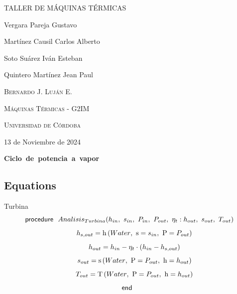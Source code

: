 \documentclass[10pt,fleqn]{article}
\author{Gustavo Vergara}
\theoremstyle{mytheoremstyle}
\theoremstyle{mytheoremstyle}
\theoremstyle{myproblemstyle}
\newcommand{\F}[1]{\mbox{$#1$}}
\newcommand{\K}[1]{\mbox{\sf#1\ \ \mit}}
\newcommand{\I}{\mbox{\hspace{0.20in}}}
\newcommand{\temperature}{\mathrm{T}}
\newcommand{\enthalpy}{\mathrm{h}}
\newcommand{\entropy}{\mathrm{s}}
\begin{document}
\begin{titlepage}
	\centering
	\vspace{2.5cm}
	{\scshape \Large TALLER DE MÁQUINAS TÉRMICAS\par}
	\vspace{5cm}
	\textbf\large\scshape{\par}
	\vspace{0.5cm}
	{\Large Vergara Pareja Gustavo\par}
    {\Large Martínez Causil Carlos Alberto\par}
    {\Large Soto Suárez Iván Esteban\par}
    {\Large Quintero Martínez Jean Paul\par}
	\vspace{5cm}
	{\scshape\Large Bernardo J. Luján E. \par}
	\vspace{0.3cm}
	{\scshape\Large Máquinas Térmicas - G2IM \par}
	\vspace{0.3cm}
	{\scshape\Large Universidad de Córdoba\par}
	\vspace{0.3cm}
	{\Large 13 de Noviembre de 2024 \par}
\end{titlepage}
\begin{center}
\bf \mbox{Ciclo de potencia a vapor}
\vspace{0.2 in}
\end{center}
\subsection*{Equations}

\vspace{0.10in}
\noindent
{\color{blue} \rm Turbina}
\begin{equation}
\label{EES Eqn:1}
\K{procedure} \F{Analisis_{Turbina}}{ \left( h_{in},\ s_{in},\ P_{in},\ P_{out},\ \eta_{t}:h_{out},\ s_{out},\ T_{out} \right) } 
\end{equation}
\begin{equation}
\I \label{EES Eqn:2}
h_{s,out} = \enthalpy \left(\F{Water},\mbox{\ s}=s_{in},\mbox{\ P}=P_{out} \right)  
\end{equation}
\begin{equation}
\I \label{EES Eqn:3}
h_{out} = h_{in}-\eta_{t}\cdot  \left( h_{in}-h_{s,out} \right)  
\end{equation}
\begin{equation}
\I \label{EES Eqn:4}
s_{out} = \entropy \left(\F{Water},\mbox{\ P}=P_{out},\mbox{\ h}=h_{out} \right)  
\end{equation}
\begin{equation}
\I \label{EES Eqn:5}
T_{out} = \temperature \left(\F{Water},\mbox{\ P}=P_{out},\mbox{\ h}=h_{out} \right)  
\end{equation}
\begin{equation}
\label{EES Eqn:6}
\K{end} 
\end{equation}
\end{document}
